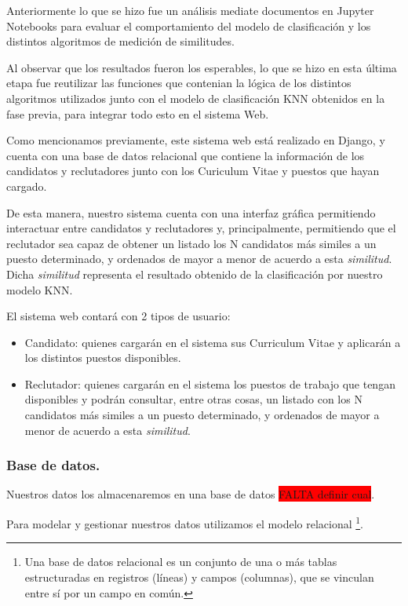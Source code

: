 \documentclass[12pt,a4paper]{article}
\begin{document}
\begin{sloppypar}
Anteriormente lo que se hizo fue un análisis mediate documentos en Jupyter Notebooks para evaluar el comportamiento del modelo de clasificación y los distintos algoritmos de medición de similitudes. 

Al observar que los resultados fueron los esperables, lo que se hizo en esta última etapa fue reutilizar las funciones que contenian la lógica de los distintos algoritmos utilizados junto con el modelo de clasificación KNN obtenidos en la fase previa, para integrar todo esto en el sistema Web. 

Como mencionamos previamente, este sistema web está realizado en Django, y cuenta con una base de datos relacional que contiene la información de los candidatos y reclutadores junto con los Curiculum Vitae y puestos que hayan cargado. 

De esta manera, nuestro sistema cuenta con una interfaz gráfica permitiendo interactuar entre candidatos y reclutadores y, principalmente, permitiendo que el reclutador sea capaz de obtener un listado los N candidatos más similes a un puesto determinado, y ordenados de mayor a menor de acuerdo a esta \textit{similitud}. Dicha \textit{similitud} representa el resultado obtenido de la clasificación por nuestro modelo KNN.

El sistema web contará con 2 tipos de usuario: 
\begin{itemize}
\item Candidato: quienes cargarán en el sistema sus Curriculum Vitae y aplicarán a los distintos puestos disponibles.
\item Reclutador: quienes cargarán en el sistema los puestos de trabajo que tengan disponibles y podrán consultar, entre otras cosas, un listado con los N candidatos más similes a un puesto determinado, y ordenados de mayor a menor de acuerdo a esta \textit{similitud}.
\end{itemize}

\cleardoublepage

\subsubsection{Base de datos.}

Nuestros datos los almacenaremos en una base de datos \colorbox{red}{FALTA definir cual}. 

Para modelar y gestionar nuestros datos utilizamos el modelo relacional \footnote{Una base de datos relacional es un conjunto de una o más tablas estructuradas en registros (líneas) y campos (columnas), que se vinculan entre sí por un campo en común.}.


\end{sloppypar}
\end{document}

